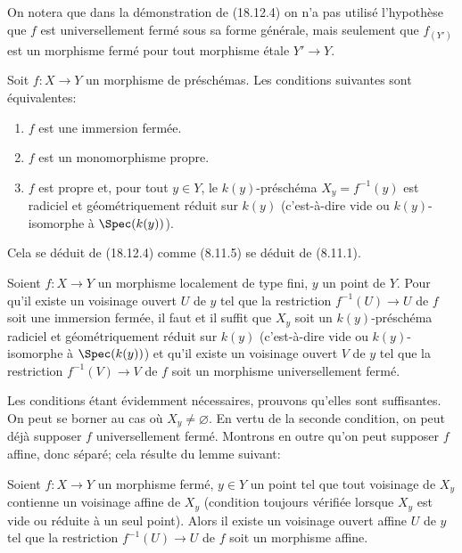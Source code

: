\begin{remark}[18.12.5]
\label{IV.18.12.5}
On notera que dans la démonstration de (18.12.4) on n'a pas utilisé l'hypothèse que $f$ est universellement fermé sous sa forme générale, mais seulement que $f_{(Y')}$ est un morphisme fermé pour tout morphisme étale $Y'\to Y$.
\end{remark}

\begin{corollary}[18.12.6]
\label{IV.18.12.6}
Soit $f:X\to Y$ un morphisme de préschémas. Les conditions suivantes sont équivalentes:
\begin{enumerate}
  \item[$a)$] $f$ est une immersion fermée.
  \item[$b)$] $f$ est un monomorphisme propre.
  \item[$c)$] $f$ est propre et, pour tout $y\in Y$, le $k(y)$-préschéma $X_y=f^{-1}(y)$ est radiciel et géométriquement réduit sur $k(y)$ (c'est-à-dire vide ou $k(y)$-isomorphe à $\Spec(k(y))$).
\end{enumerate}
\end{corollary}

Cela se déduit de (18.12.4) comme (8.11.5) se déduit de (8.11.1).

\begin{proposition}[18.12.7]
\label{IV.18.12.7}
Soient $f:X\to Y$ un morphisme localement de type fini, $y$ un point de $Y$. Pour qu'il existe un voisinage ouvert $U$ de $y$ tel que la restriction $f^{-1}(U)\to U$ de $f$ soit une immersion fermée, il faut et il suffit que $X_y$ soit un $k(y)$-préschéma radiciel et géométriquement réduit sur $k(y)$ (c'est-à-dire vide ou $k(y)$-isomorphe à $\Spec(k(y))$) et qu'il existe un voisinage ouvert $V$ de $y$ tel que la restriction $f^{-1}(V)\to V$ de $f$ soit un morphisme universellement fermé.
\end{proposition}

Les conditions étant évidemment nécessaires, prouvons qu'elles sont suffisantes. On peut se borner au cas où $X_y\neq\varnothing$. En vertu de la seconde condition, on peut déjà supposer $f$ universellement fermé. Montrons en outre qu'on peut supposer $f$ affine, donc séparé; cela résulte du lemme suivant:

\begin{lemma}[18.12.7.1]
\label{IV.18.12.7.1}
Soient $f:X\to Y$ un morphisme fermé, $y\in Y$ un point tel que tout voisinage de $X_y$ contienne un voisinage affine de $X_y$ (condition toujours vérifiée lorsque $X_y$ est vide ou réduite à un seul point). Alors il existe un voisinage ouvert affine $U$ de $y$ tel que la restriction $f^{-1}(U)\to U$ de $f$ soit un morphisme affine.
\end{lemma}

